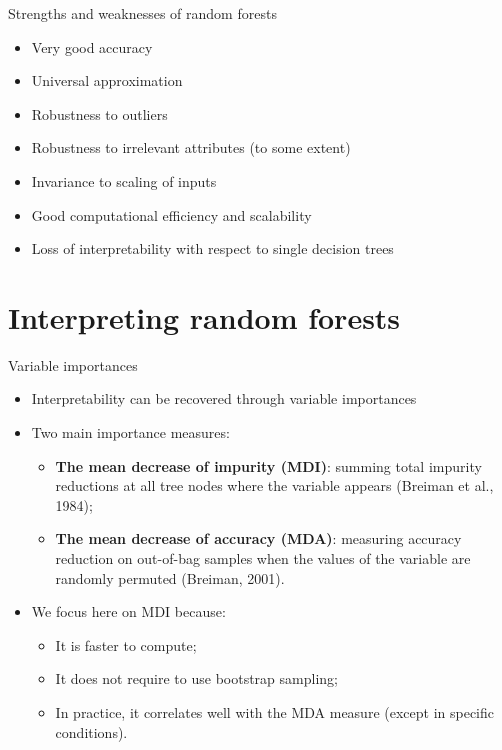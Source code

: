 \documentclass{beamer}
\begin{document}
\begin{frame}{Strengths and weaknesses of random forests}

\begin{itemize}
\item Very good accuracy
\item Universal approximation
\item Robustness to outliers
\item Robustness to irrelevant attributes (to some extent)
\item Invariance to scaling of inputs
\item Good computational efficiency and scalability

\bigskip

\item<2> \alert{Loss of interpretability with respect to single decision trees}
\end{itemize}

\end{frame}



\section{Interpreting random forests}


\begin{frame}{Variable importances}

\begin{itemize}
\item Interpretability can be recovered through {\color{blue}variable importances}

\bigskip

\item<2-> Two main importance measures:
    \begin{itemize}
    \item {\bf The mean decrease of impurity (MDI)}: summing total impurity reductions
      at all tree nodes where the variable appears {\scriptsize (Breiman et al., 1984)};
    \item {\bf The mean decrease of accuracy (MDA)}: measuring
      accuracy reduction on out-of-bag samples when the values of the
      variable are randomly permuted {\scriptsize (Breiman, 2001)}.
    \end{itemize}

\bigskip

\item<3-> We focus here on MDI because:
\begin{itemize}
\item It is faster to compute;
\item It does not require to use bootstrap sampling;
\item In practice, it correlates well with the MDA
  measure (except in specific conditions).
\end{itemize}

\end{itemize}
\end{frame}
\end{document}
